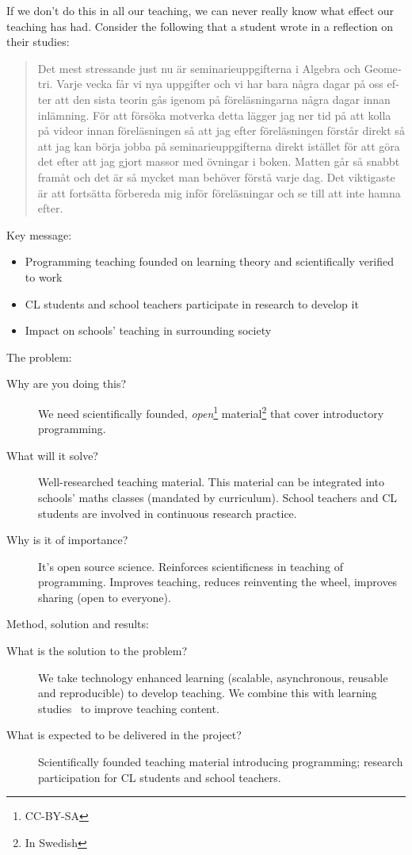 If we don't do this in all our teaching, we can never really know what effect 
our teaching has had.
Consider the following that a student wrote in a reflection on their studies:
\foreignblockquote{swedish}{Det mest stressande just nu är seminarieuppgifterna 
  i Algebra och Geometri.
  Varje vecka får vi nya uppgifter och vi har bara några dagar på oss efter att 
  den sista teorin gås igenom på föreläsningarna några dagar innan inlämning.
  För att försöka motverka detta lägger jag ner tid på att kolla på videor
  innan föreläsningen så att jag efter föreläsningen förstår direkt så att jag 
  kan börja jobba på seminarieuppgifterna direkt istället för att göra det 
  efter att jag gjort massor med övningar i boken.
  Matten går så snabbt framåt och det är så mycket man behöver förstå varje 
  dag.
  Det viktigaste är att fortsätta förbereda mig inför föreläsningar och se till 
att inte hamna efter.}


Key message:
\begin{itemize}
  \item Programming teaching founded on learning theory and scientifically 
    verified to work

  \item CL students and school teachers participate in research to develop it

  \item Impact on schools' teaching in surrounding society
\end{itemize}

The problem:
\begin{description}
  \item[Why are you doing this?]
    We need scientifically founded, \emph{open}\footnote{CC-BY-SA} 
    material\footnote{In Swedish} that cover introductory programming.

  \item[What will it solve?]
    Well-researched teaching material.
    This material can be integrated into schools’ maths classes (mandated by 
    curriculum).
    School teachers and CL students are involved in continuous research 
    practice.

  \item[Why is it of importance?]
    It's open source science.
    Reinforces scientificness in teaching of programming.
    Improves teaching, reduces reinventing the wheel, improves sharing (open to 
    everyone).
\end{description}

Method, solution and results:
\begin{description}
  \item[What is the solution to the problem?]
    We take technology enhanced learning (scalable, asynchronous, reusable and 
    reproducible) to develop teaching.
    We combine this with learning studies~\parencite{LearningStudy} to improve 
    teaching content.

  \item[What is expected to be delivered in the project?]
    Scientifically founded teaching material introducing programming;
    research participation for CL students and school teachers.
\end{description}

